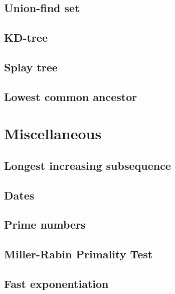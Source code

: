 \subsection{Union-find set}
\raggedbottom
\hrulefill
\subsection{KD-tree}
\raggedbottom
\hrulefill
\subsection{Splay tree}
\raggedbottom
\hrulefill
\subsection{Lowest common ancestor}
\raggedbottom
\hrulefill

\section{Miscellaneous}
\subsection{Longest increasing subsequence}
\raggedbottom
\hrulefill
\subsection{Dates}
\raggedbottom
\hrulefill
\subsection{Prime numbers}
\raggedbottom
\hrulefill
\subsection{Miller-Rabin Primality Test}
\raggedbottom
\hrulefill
\subsection{Fast exponentiation}
\raggedbottom
\hrulefill
